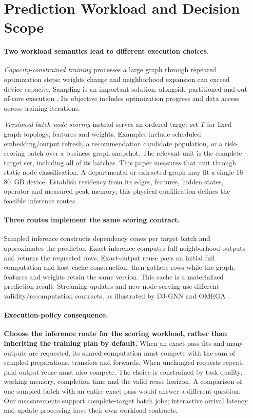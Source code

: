 \documentclass[sigconf, nonacm]{acmart}
\begin{document}
\section{Prediction Workload and Decision Scope}
\label{sec:workload}
\paragraph{Two workload semantics lead to different execution choices.}
\emph{Capacity-constrained training} processes a large graph through repeated optimization steps: weights change and neighborhood expansion can exceed device capacity. Sampling is an important solution, alongside partitioned and out-of-core execution \cite{wan2022bnsgcn,waleffe2023mariusgnn,wang2023mgg}. Its objective includes optimization progress and data access across training iterations.

\emph{Versioned batch node scoring} instead serves an ordered target set $T$ for fixed graph topology, features and weights. Examples include scheduled embedding/output refresh, a recommendation candidate population, or a risk-scoring batch over a business graph snapshot. The relevant unit is the complete target set, including all of its batches. This paper measures that unit through static node classification. A departmental or extracted graph may fit a single 16--80~GB device. Establish residency from its edges, features, hidden states, operator and measured peak memory; this physical qualification defines the feasible inference routes.

\paragraph{Three routes implement the same scoring contract.}
Sampled inference constructs dependency cones per target batch and approximates the predictor. Exact inference computes full-neighborhood outputs and returns the requested rows. Exact-output reuse pays an initial full computation and host-cache construction, then gathers rows while the graph, features and weights retain the same version. This cache is a materialized prediction result. Streaming updates and new-node serving use different validity/recomputation contracts, as illustrated by D3-GNN and OMEGA \cite{guliyev2024d3gnn,kim2026omega}.

\paragraph{Execution-policy consequence.}
\textbf{Choose the inference route for the scoring workload, rather than inheriting the training plan by default.} When an exact pass fits and many outputs are requested, its shared computation must compete with the sum of sampled preparations, transfers and forwards. When unchanged requests repeat, paid output reuse must also compete. The choice is constrained by task quality, working memory, completion time and the valid reuse horizon. A comparison of one sampled batch with an entire exact pass would answer a different question. Our measurements support complete-target batch jobs; interactive arrival latency and update processing have their own workload contracts.
\end{document}
